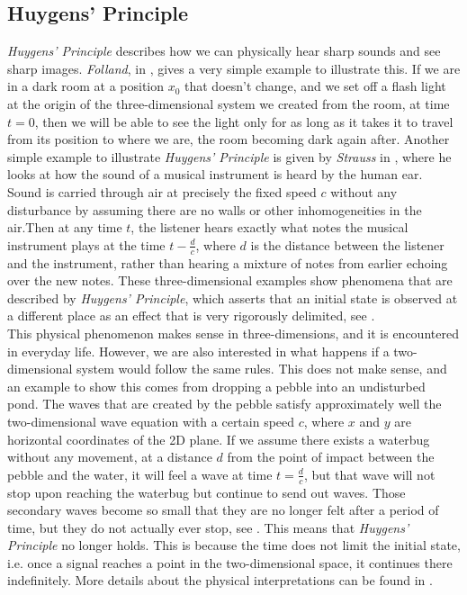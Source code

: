 \documentclass[a4paper, 12pt]{article}
\numberwithin{equation}{section}
\begin{document}
\subsection{Huygens' Principle}
\emph{Huygens' Principle} describes how we can physically hear sharp sounds and
see sharp images. \emph{Folland}, in \cite[Ch 5.B]{Fol}, gives a very simple
example to illustrate this. If we are in a dark room at a position $x_0$ that
doesn't change, and we set off a flash light at the origin of the
three-dimensional system we created from the room, at time $t=0$, then we will
be able to see the light only for as long as it takes it to travel from its
position to where we are, the room becoming dark again after. Another simple
example to illustrate \emph{Huygens' Principle} is given by \emph{Strauss} in
\cite[Ch. 9.2]{Str}, where he looks at how the sound of a musical instrument is
heard by the human ear. Sound is carried through air at precisely the fixed
speed $c$ without any disturbance by assuming there are no walls or other
inhomogeneities in the air.Then at any time $t$, the listener hears exactly what
notes the musical instrument plays at the time $t-\frac{d}{c}$, where $d$ is the
distance between the listener and the instrument, rather than hearing a mixture
of notes from earlier echoing over the new notes. These three-dimensional
examples show phenomena that are described by \emph{Huygens' Principle}, which
asserts that an initial state is observed at a different place as an effect that
is very rigorously delimited, see \cite[Ch. III, \S 4.6]{Hil} . \\

This physical phenomenon makes sense in three-dimensions, and it is encountered
in everyday life. However, we are also interested in what happens if a
two-dimensional system would follow the same rules. This does not make sense,
and an example to show this comes from dropping a pebble into an undisturbed
pond. The waves that are created by the pebble satisfy approximately well the
two-dimensional wave equation with a certain speed $c$, where $x$ and $y$ are
horizontal coordinates of the 2D plane. If we assume there exists a waterbug
without any movement, at a distance $d$ from the point of impact between the
pebble and the water, it will feel a wave at time $t=\frac{d}{c}$, but that wave
will not stop upon reaching the waterbug but continue to send out waves. Those
secondary waves become so small that they are no longer felt after a period of
time, but they do not actually ever stop, see \cite[Ch. 9.2]{Str}. This means
that \emph{Huygens' Principle} no longer holds. This is because the time does
not limit the initial state, i.e. once a signal reaches a point in the
two-dimensional space, it continues there indefinitely. More details about the
physical interpretations can be found in \cite[Ch. III, \S 4.6]{Hil}. \\
\end{document}
